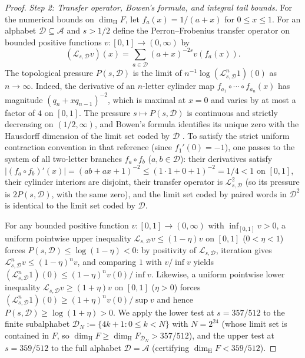 \documentclass[11pt]{article}
\theoremstyle{definition}
\theoremstyle{remark}
\newcommand{\dimH}{\dim_{\mathrm{H}}}
\begin{document}
\begin{proof}
\emph{Step 2: Transfer operator, Bowen's formula, and integral tail bounds.}
For the numerical bounds on $\dimH F$, let $f_a(x)=1/(a+x)$ for $0\le x\le1$.
For an alphabet $\mathcal D\subseteq\mathcal A$ and $s>1/2$ define the
Perron--Frobenius transfer operator on bounded positive functions $v:[0,1]\to(0,\infty)$
by
\[
 (\mathcal L_{s,\mathcal D}v)(x)
   =\sum_{a\in\mathcal D}(a+x)^{-2s}v(f_a(x)).
\]
The topological pressure $P(s,\mathcal D)$ is the limit of
$n^{-1}\log(\mathcal L_{s,\mathcal D}^n1)(0)$ as $n\to\infty$.
Indeed, the derivative of an $n$-letter cylinder map
$f_{a_1}\circ\cdots\circ f_{a_n}(x)$ has magnitude $(q_n+xq_{n-1})^{-2}$, which
is maximal at $x=0$ and varies by at most a factor of $4$ on $[0,1]$. The
pressure $s\mapsto P(s,\mathcal D)$ is continuous and strictly decreasing on
$(1/2,\infty)$, and Bowen's formula identifies its unique zero with the
Hausdorff dimension of the limit set coded by $\mathcal D$
\cite[\S2, Theorem~2.3]{CLU}. To satisfy the strict uniform contraction
convention in that reference (since $f_1'(0)=-1$), one passes to the system of
all two-letter branches $f_a\circ f_b$ ($a,b\in\mathcal D$): their derivatives
satisfy $|(f_a\circ f_b)'(x)|=(ab+ax+1)^{-2}\le(1\cdot1+0+1)^{-2}=1/4<1$ on
$[0,1]$, their cylinder interiors are disjoint, their transfer operator is
$\mathcal L_{s,\mathcal D}^2$ (so its pressure is $2P(s,\mathcal D)$, with the
same zero), and the limit set coded by paired words in $\mathcal D^2$ is
identical to the limit set coded by $\mathcal D$.

For any bounded positive function $v:[0,1]\to(0,\infty)$ with
$\inf_{[0,1]}v>0$, a uniform pointwise upper inequality
$\mathcal L_{s,\mathcal D}v\le(1-\eta)v$ on $[0,1]$ ($0<\eta<1$) forces
$P(s,\mathcal D)\le\log(1-\eta)<0$: by positivity of $\mathcal L_{s,\mathcal D}$,
iteration gives $\mathcal L_{s,\mathcal D}^n v\le(1-\eta)^n v$, and comparing $1$
with $v/\inf v$ yields
$(\mathcal L_{s,\mathcal D}^n1)(0)\le(1-\eta)^n v(0)/\inf v$.
Likewise, a uniform pointwise lower inequality
$\mathcal L_{s,\mathcal D}v\ge(1+\eta)v$ on $[0,1]$ ($\eta>0$) forces
$(\mathcal L_{s,\mathcal D}^n1)(0)\ge(1+\eta)^n v(0)/\sup v$ and hence
$P(s,\mathcal D)\ge\log(1+\eta)>0$. We apply the lower test at $s=357/512$ to
the finite subalphabet $\mathcal D_N:=\{4k+1:0\le k<N\}$ with $N=2^{24}$ (whose
limit set is contained in $F$, so $\dimH F\ge\dimH F_{\mathcal D_N}>357/512$),
and the upper test at $s=359/512$ to the full alphabet $\mathcal D=\mathcal A$
(certifying $\dimH F<359/512$).


\end{proof}
\end{document}
